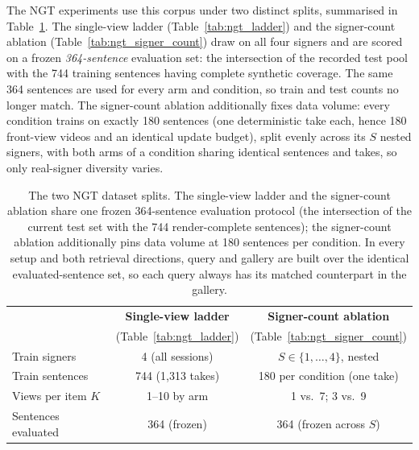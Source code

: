 The NGT experiments use this corpus under two distinct splits, summarised
in Table~\ref{tab:ngt_setups}. The single-view ladder
(Table~\ref{tab:ngt_ladder}) and the signer-count
ablation (Table~\ref{tab:ngt_signer_count}) draw on all four
signers and are scored on a frozen \emph{364-sentence} evaluation set:
the intersection of the recorded test pool with the 744 training sentences
having complete synthetic coverage. The same 364 sentences are
used for every arm and condition, so train and test counts no longer
match. 
The signer-count ablation additionally fixes data
volume: every condition trains on exactly 180 sentences (one deterministic
take each, hence 180 front-view videos and an identical update budget),
split evenly across its $S$ nested signers, with both arms of a condition
sharing identical sentences and takes, so only real-signer diversity
varies.
\begin{table}[t]
\centering
\footnotesize
\setlength{\tabcolsep}{4pt}
\begin{tabular}{lcc}
\toprule
 & \textbf{Single-view ladder} & \textbf{Signer-count ablation} \\
 & (Table~\ref{tab:ngt_ladder}) & (Table~\ref{tab:ngt_signer_count}) \\
\midrule
Train signers & 4 (all sessions) & $S\in\{1,\ldots,4\}$, nested \\
Train sentences & 744 (1{,}313 takes) & 180 per condition (one take) \\
Views per item $K$ & 1--10 by arm & 1 vs.\ 7; 3 vs.\ 9 \\
Sentences evaluated & 364 (frozen) & 364 (frozen across $S$) \\
\bottomrule
\end{tabular}
\caption{The two NGT dataset splits. The single-view ladder and the
signer-count ablation
share one frozen 364-sentence evaluation protocol (the intersection of the
current test set with the 744 render-complete sentences); the signer-count
ablation additionally pins data volume at 180 sentences per condition. In
every setup and both retrieval directions, query and gallery are built
over the identical evaluated-sentence set, so each query always has its
matched counterpart in the gallery.}
\label{tab:ngt_setups}
\end{table}


